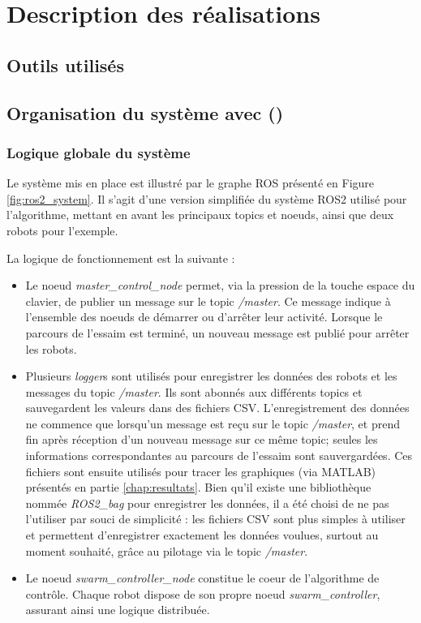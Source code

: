 \chapter{Description des réalisations}

\section{Outils utilisés}



\section{Organisation du système avec  ()}

\subsection{Logique globale du système}
Le système mis en place est illustré par le graphe ROS présenté en Figure \ref{fig:ros2_system}. Il s'agit d'une version simplifiée du système ROS2 utilisé pour l’algorithme, mettant en avant les principaux topics et noeuds, ainsi que deux robots pour l’exemple.



La logique de fonctionnement est la suivante :
\begin{itemize}
    \item Le noeud \textit{master\_control\_node} permet, via la pression de la touche espace du clavier, de publier un message sur le topic \textit{/master}. Ce message indique à l’ensemble des noeuds de démarrer ou d’arrêter leur activité. Lorsque le parcours de l'essaim est terminé, un nouveau message est publié pour arrêter les robots.
    \item Plusieurs \textit{logger}s sont utilisés pour enregistrer les données des robots et les messages du topic \textit{/master}. Ils sont abonnés aux différents topics et sauvegardent les valeurs dans des fichiers CSV. L’enregistrement des données ne commence que lorsqu’un message est reçu sur le topic \textit{/master}, et prend fin après réception d’un nouveau message sur ce même topic; seules les informations correspondantes au parcours de l’essaim sont sauvergardées. Ces fichiers sont ensuite utilisés pour tracer les graphiques (via MATLAB) présentés en partie \ref{chap:resultats}. Bien qu’il existe une bibliothèque nommée \textit{ROS2\_bag} pour enregistrer les données, il a été choisi de ne pas l’utiliser par souci de simplicité : les fichiers CSV sont plus simples à utiliser et permettent d’enregistrer exactement les données voulues, surtout au moment souhaité, grâce au pilotage via le topic \textit{/master}.
    \item Le noeud \textit{swarm\_controller\_node} constitue le coeur de l’algorithme de contrôle. Chaque robot dispose de son propre noeud \textit{swarm\_controller}, assurant ainsi une logique distribuée.  
\end{itemize}

